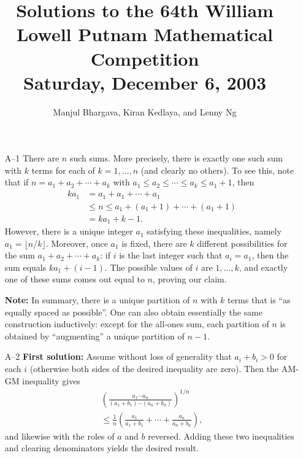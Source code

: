 \documentclass[amssymb,twocolumn,pra,10pt,aps]{revtex4-1}
\begin{document}
\title{Solutions to the 64th William Lowell Putnam Mathematical Competition \\
    Saturday, December 6, 2003}
\author{Manjul Bhargava, Kiran Kedlaya, and Lenny Ng}
\noaffiliation
\maketitle

\begin{itemize}

\item[A--1]
There are $n$ such sums. More precisely, there is exactly one such sum
with $k$ terms for each of $k=1, \dots, n$ (and clearly no others).
To see this, note that if $n = a_1 + a_2 + \cdots + a_k$ with
$a_1 \leq a_2 \leq \cdots \leq a_k \leq a_1 + 1$, then
\begin{align*}
ka_1 &= a_1 + a_1 + \cdots + a_1 \\
&\leq n \leq a_1 + (a_1 + 1) + \cdots + (a_1 + 1) \\
&= ka_1 + k-1.
\end{align*}
However, there is a unique integer $a_1$ satisfying these inequalities,
namely $a_1 = \lfloor n/k \rfloor$. Moreover, once $a_1$ is fixed,
there are $k$ different possibilities for the sum $a_1 + a_2 + \cdots + a_k$:
if $i$ is the last integer such that $a_i = a_1$, then the sum equals
$ka_1 + (i-1)$. The possible values of $i$ are $1, \dots, k$,
and exactly one of these sums comes out equal to $n$, proving
our claim.

\textbf{Note:}
In summary, there is a unique partition of $n$ with $k$ terms that is
``as equally spaced as possible''.
One can also obtain essentially the same construction inductively: except
for the all-ones sum, each partition of $n$ is obtained by ``augmenting''
a unique partition of $n-1$.

\item[A--2]
\textbf{First solution:}
Assume without loss of generality that $a_i + b_i > 0$
for each $i$ (otherwise both sides of the desired inequality are zero).
Then the AM-GM inequality gives
\begin{multline*}
\left( \frac{a_1\cdots a_n}{(a_1+b_1)\cdots(a_n+b_n)} \right)^{1/n} \\
\leq \frac{1}{n} \left( \frac{a_1}{a_1 + b_1} + \cdots + \frac{a_n}{a_n+b_n}
\right),
\end{multline*}
and likewise with the roles of $a$ and $b$ reversed. Adding these two
inequalities and clearing denominators yields the desired result.


\end{itemize}
\end{document}
